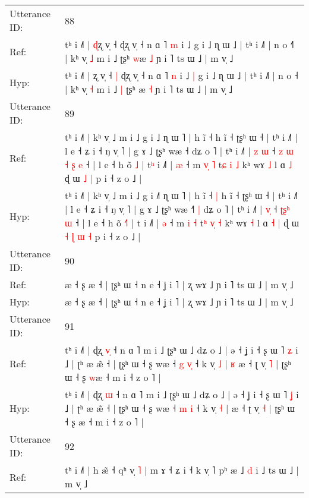 \documentclass[10pt]{article}
\DeclareRobustCommand{\hl}[1]{{\textcolor{red}{#1}}}
\begin{document}
\begin{longtable}{ll}
 \\
\midrule
Utterance ID: & 88 \\
Ref: & tʰ i ˩˥ | \hl{ɖ}ʐ v̩ ˧\hl{}\hl{} ɖʐ v̩ ˧ n ɑ ˥ \hl{m} i ˩\hl{}\hl{} g i ˩ ɳ ɯ ˩ | tʰ i ˩˥ | n o ˧\hl{˥} | kʰ v̩ \hl{˩} m i ˩\hl{}\hl{} ʈʂʰ \hl{w}æ \hl{˩} ɲ i ˥ ts ɯ ˩ | m v̩ ˩
 \\
Hyp: & tʰ i ˩˥ | \hl{}ʐ v̩ ˧\hl{ }\hl{|} ɖʐ v̩ ˧ n ɑ ˥ \hl{n} i ˩\hl{ }\hl{|} g i ˩ ɳ ɯ ˩ | tʰ i ˩˥ | n o ˧\hl{} | kʰ v̩ \hl{˧} m i ˩\hl{ }\hl{|} ʈʂʰ \hl{}æ \hl{˧} ɲ i ˥ ts ɯ ˩ | m v̩ ˩
 \\
\midrule
Utterance ID: & 89 \\
Ref: & tʰ i ˩˥ | kʰ v̩ ˩ m i ˩ g i ˩\hl{} ɳ ɯ ˥ | h ĩ ˧\hl{}\hl{} h ĩ ˧ ʈʂʰ ɯ ˧ | tʰ i ˩˥ | l e ˧ ʑ i ˧ ŋ v̩ ˥ | g ɤ ˩ ʈʂʰ wæ ˧\hl{}\hl{}\hl{} dʑ o ˥ | tʰ i ˩˥ | \hl{z}\hl{ }\hl{ɯ} ˧\hl{ }\hl{z}\hl{ }\hl{ɯ} \hl{˧}\hl{ }\hl{ʂ} \hl{e} ˧ | l e ˧ h õ \hl{}\hl{˩} | t\hl{ʰ} i ˩˥ | \hl{æ} ˧ m \hl{v}\hl{̩} \hl{˥} t\hl{ɕ} \hl{}\hl{i} \hl{˩} kʰ wɤ \hl{˩} l ɑ\hl{}\hl{} \hl{˩} ɖ ɯ\hl{}\hl{}\hl{}\hl{} \hl{˩} \hl{|} p i ˧ z o ˩ |
 \\
Hyp: & tʰ i ˩˥ | kʰ v̩ ˩ m i ˩ g i ˩\hl{˥} ɳ ɯ ˥ | h ĩ ˧\hl{ }\hl{|} h ĩ ˧ ʈʂʰ ɯ ˧ | tʰ i ˩˥ | l e ˧ ʑ i ˧ ŋ v̩ ˥ | g ɤ ˩ ʈʂʰ wæ ˧\hl{˥}\hl{ }\hl{|} dʑ o ˥ | tʰ i ˩˥ | \hl{}\hl{v}\hl{̩} ˧\hl{}\hl{}\hl{}\hl{} \hl{ʈ}\hl{ʂ}\hl{ʰ} \hl{ɯ} ˧ | l e ˧ h õ \hl{˧}\hl{˥} | t\hl{} i ˩˥ | \hl{ə} ˧ m \hl{}\hl{i} \hl{˧} t\hl{ʰ} \hl{v}\hl{̩} \hl{˧} kʰ wɤ \hl{˧} l ɑ\hl{ }\hl{˧} \hl{|} ɖ ɯ\hl{ }\hl{˧}\hl{ }\hl{ɭ} \hl{ɯ} \hl{˧} p i ˧ z o ˩ |
 \\
\midrule
Utterance ID: & 90 \\
Ref: & æ ˧ ʂ æ ˧ | ʈʂʰ ɯ ˧ n e ˧ ʝ i ˥ | ʐ wɤ ˩ ɲ i ˥ ts ɯ ˩ | m v̩ ˩
 \\
Hyp: & æ ˧ ʂ æ ˧ | ʈʂʰ ɯ ˧ n e ˧ ʝ i ˥ | ʐ wɤ ˩ ɲ i ˥ ts ɯ ˩ | m v̩ ˩
 \\
\midrule
Utterance ID: & 91 \\
Ref: & tʰ i ˩˥ | ɖʐ \hl{v}\hl{̩} ˧ n ɑ ˥ m i ˩ ʈʂʰ ɯ ˩ dʑ o ˩ | ə ˧ ʝ i ˧ ʂ ɯ ˥ \hl{ʑ} i ˩ | ʈʰ æ æ̃ ˧ | ʈʂʰ ɯ ˧ ʂ wæ ˧ \hl{g} \hl{v}\hl{̩} ˧ k v̩ \hl{˩} |\hl{ }\hl{ʁ} æ ˧ ʈ v̩ \hl{˥} | ʈʂʰ ɯ ˧ ʂ \hl{w}æ ˧ m i ˧ z o ˥ |
 \\
Hyp: & tʰ i ˩˥ | ɖʐ \hl{}\hl{ɯ} ˧ n ɑ ˥ m i ˩ ʈʂʰ ɯ ˩ dʑ o ˩ | ə ˧ ʝ i ˧ ʂ ɯ ˥ \hl{ʝ} i ˩ | ʈʰ æ æ̃ ˧ | ʈʂʰ ɯ ˧ ʂ wæ ˧ \hl{m} \hl{}\hl{i} ˧ k v̩ \hl{˧} |\hl{}\hl{} æ ˧ ʈ v̩ \hl{˧} | ʈʂʰ ɯ ˧ ʂ \hl{}æ ˧ m i ˧ z o ˥ |
 \\
\midrule
Utterance ID: & 92 \\
Ref: & tʰ i ˩˥ | h æ̃ ˧ qʰ v̩ \hl{˥} | m ɤ ˧ ʑ i ˧ k v̩ ˥ pʰ æ ˩ \hl{d} i ˩ ts ɯ ˩ | m v̩ ˩

\end{longtable}
\end{document}
